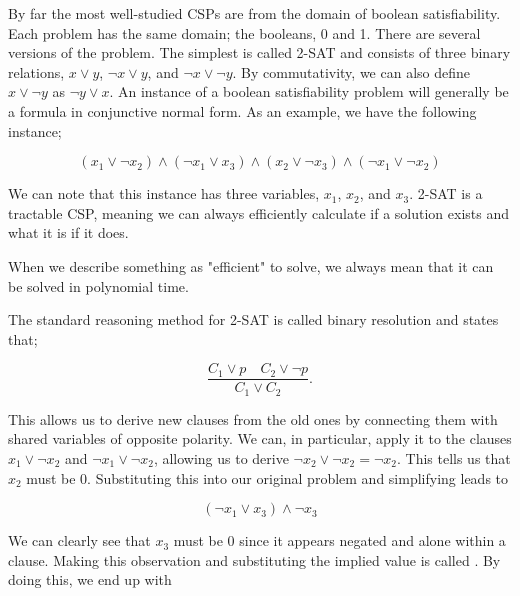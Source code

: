 By far the most well-studied CSPs are from the domain of boolean satisfiability. Each problem has the same domain; the booleans, 0 and 1. There are several versions of the problem. The simplest is called 2-SAT and consists of three binary relations, $x \vee y$, $\neg x \vee y$, and $\neg x \vee \neg y$. By commutativity, we can also define $x \vee \neg y$ as $\neg y \vee x$. An instance of a boolean satisfiability problem will generally be a formula in conjunctive normal form. As an example, we have the following instance;

\begin{equation}\label{equation:two-sat-example-pt1}
    (x_1 \lor \neg x_2) \land (\neg x_1 \lor x_3) \land (x_2 \lor \neg x_3) \land (\neg x_1 \lor \neg x_2)
\end{equation}

We can note that this instance has three variables, $x_1$, $x_2$, and $x_3$. 2-SAT is a tractable CSP, meaning we can always efficiently calculate if a solution exists and what it is if it does. 

\begin{remark}
    When we describe something as "efficient" to solve, we always mean that it can be solved in polynomial time.
\end{remark}

The standard reasoning method for 2-SAT is called binary resolution and states that;

\begin{equation}\label{equation:binary-resolution}
\frac{C_1 \lor p \quad C_2 \lor \neg p}{C_1 \lor C_2}.
\end{equation}

This allows us to derive new clauses from the old ones by connecting them with shared variables of opposite polarity. We can, in particular, apply it to the clauses $x_1 \lor \neg x_2$ and $\neg x_1 \lor \neg x_2$, allowing us to derive $\neg x_2 \lor \neg x_2 = \neg x_2$. This tells us that $x_2$ must be $0$. Substituting this into our original problem and simplifying leads to

\begin{equation}\label{equation:two-sat-example-pt2}
(\neg x_1 \lor x_3) \land \neg x_3
\end{equation}

We can clearly see that $x_3$ must be $0$ since it appears negated and alone within a clause. Making this observation and substituting the implied value is called .
By doing this, we end up with

